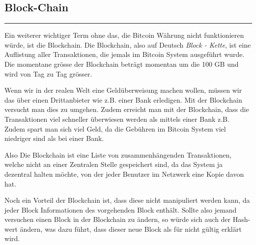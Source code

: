 \vspace*{1mm}
\subsection*{Block-Chain}
\vspace{-10mm}
\noindent\rule{0.8\textwidth}{0.4pt}

\vspace{5mm}

\noindent
Ein weiterer wichtiger Term ohne das, die Bitcoin Währung nicht funktionieren würde, ist die Blockchain.
Die Blockchain, also auf Deutsch \emph{\dq Block - Kette\dq}, ist eine Auflistung aller Transaktionen, die jemals im Bitcoin System ausgeführt wurde.
Die momentane grösse der Blockchain beträgt momentan um die 100 GB und wird von Tag zu Tag grösser.

\noindent
Wenn wir in der realen Welt eine Geldüberweisung machen wollen, müssen wir das über einen Drittanbieter wie z.B. einer Bank erledigen. Mit der Blockchain
versucht man dies zu umgehen. Zudem erreicht man mit der Blockchain, dass die Transaktionen viel schneller überwiesen werden als mittels einer Bank z.B. Zudem
spart man sich viel Geld, da die Gebühren im Bitcoin System viel niedriger sind als bei einer Bank.

\noindent
Also Die Blockchain ist eine Liste von zusammenhängenden Transaktionen, welche nicht an  einer Zentralen Stelle gespeichert sind, da das System ja dezentral halten möchte,
von der jeder Benutzer im Netzwerk eine Kopie davon hat.

\noindent
Noch ein Vorteil der Blockchain ist, dass diese nicht manipuliert werden kann, da jeder Block Informationen des vorgehenden Block enthält. Sollte also jemand versuchen einen Block in der Blockchain
zu ändern, so würde sich auch der Hash-wert ändern, was dazu führt, dass dieser neue Block als für nicht gültig erklärt wird.

\newpage
